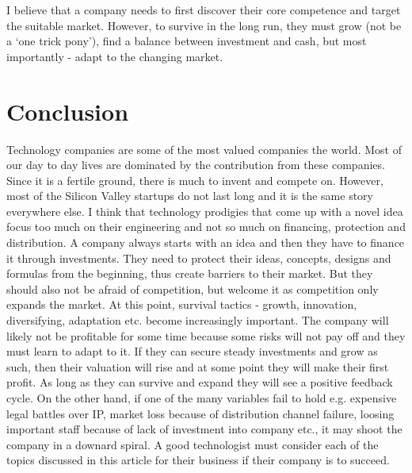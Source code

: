 \documentclass[twocolumn]{bmcart}%
\begin{document}
\par I believe that a company needs to first discover their core competence and target the suitable market. However, to survive in the long run, they must grow (not be a `one trick pony'), find a balance between investment and cash, but most importantly - adapt to the changing market.
      
\section*{Conclusion}
Technology companies are some of the most valued companies the world. Most of our day to day lives are dominated by the contribution from these companies. Since it is a fertile ground, there is much to invent and compete on. However, most of the Silicon Valley startups do not last long and it is the same story everywhere else. I think that technology prodigies that come up with a novel idea focus too much on their engineering and not so much on financing, protection and distribution. A company always starts with an idea and then they have to finance it through investments. They need to protect their ideas, concepts, designs and formulas from the beginning, thus create barriers to their market. But they should also not be afraid of competition, but welcome it as competition only expands the market. At this point, survival tactics - growth, innovation, diversifying, adaptation etc. become increasingly important. The company will likely not be profitable for some time because some risks will not pay off and they must learn to adapt to it. If they can secure steady investments and grow as such, then their valuation will rise and at some point they will make their first profit. As long as they can survive and expand they will see a positive feedback cycle. On the other hand, if one of the many variables fail to hold e.g. expensive legal battles over IP, market loss because of distribution channel failure, loosing important staff because of lack of investment into company etc., it may shoot the company in a downard spiral. A good technologist must consider each of the topics discussed in this article for their business if their company is to succeed.


\begin{backmatter}

\nocite{*}

\end{backmatter}
\end{document}
